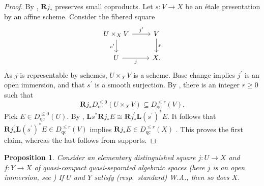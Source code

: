 \documentclass[11pt]{amsart}
\theoremstyle{plain}
\newtheorem{proposition}[theorem]{Proposition}
\theoremstyle{definition}
\numberwithin{equation}{section}
\numberwithin{theorem}{section}
\begin{document}
\begin{proof}
    By \cite[\href{https://stacks.math.columbia.edu/tag/08FB}{Tag 08FB}]{StacksProject}, $\mathbf{R}j_\ast$ preserves small coproducts.
    Let $s\colon V \to X$ be an \'{e}tale presentation by an affine scheme.
    Consider the fibered square 
    \begin{displaymath}
        \begin{tikzcd}
            {U\times_{X} V} & V \\
            {U} & {X.}
            \arrow["{j^\prime}", from=1-1, to=1-2]
            \arrow["{s^\prime}"', from=1-1, to=2-1]
            \arrow["s", from=1-2, to=2-2]
            \arrow["j"', from=2-1, to=2-2]
        \end{tikzcd}
    \end{displaymath}
    As $j$ is representable by schemes, $U\times_{X} V$ is a scheme.
    Base change implies $j^\prime$ is an open immersion, and that $s^\prime$ is a smooth surjection.
    By \cite[Proposition 3.9.2]{Lipman:2009}, there is an integer $r\geq 0$ such that
	\begin{displaymath}
		\mathbf{R}j_\ast D^{\leq 0}_{\operatorname{qc}}(U\times_{X} V)
		\subseteq D^{\leq r}_{\operatorname{qc}}(V).
	\end{displaymath}
    Pick $E\in D^{\leq 0}_{\operatorname{qc}}(U)$.
    By \cite[\href{https://stacks.math.columbia.edu/tag/08IR}{Tag 08IR}]{StacksProject}, $\mathbf{L}s^\ast \mathbf{R}j_\ast E \cong \mathbf{R}j^\prime_\ast \mathbf{L}(s^\prime)^\ast E$.
    It follows that $\mathbf{R}j^\prime_\ast \mathbf{L}(s^\prime)^\ast E \in D^{\leq r}_{\operatorname{qc}}(V)$ implies $\mathbf{R}j_\ast E \in D^{\leq r}_{\operatorname{qc}}(X)$ \cite[Lemma 2.15]{GuisadoVillaalgordo/Lank:2026}.
    This proves the first claim, whereas the last follows from supports.
\end{proof}

\begin{proposition}
    \label{prop:A8}
    Consider an elementary distinguished square $j\colon U\to X$ and $f\colon Y\to X$ of quasi-compact quasi-separated algebraic spaces (here $j$ is an open immersion, see \cite[\href{https://stacks.math.columbia.edu/tag/08GM}{Tag 08GM}]{StacksProject}) 
    If $U$ and $Y$ satisfy (resp.\ standard) W.A., then so does $X$.
\end{proposition}
\end{document}

